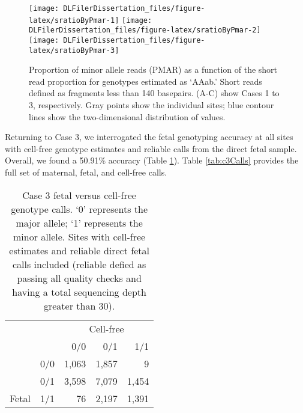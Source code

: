 \documentclass[11pt,letterpaper]{book}
\begin{document}
\begin{figure}

{\centering \texttt{[image: DLFilerDissertation\_files/figure-latex/sratioByPmar-1]} \texttt{[image: DLFilerDissertation\_files/figure-latex/sratioByPmar-2]} \texttt{[image: DLFilerDissertation\_files/figure-latex/sratioByPmar-3]} 

}

\caption[Relationship between PMAR and fraction of reads \textless140 basepairs.]{Proportion of minor allele reads (PMAR) as a function of the short read proportion for genotypes estimated as `AAab.' Short reads defined as fragments less than 140 basepairs. (A-C) show Cases 1 to 3, respectively. Gray points show the individual sites; blue contour lines show the two-dimensional distribution of values.}\label{fig:sratioByPmar}
\end{figure}

Returning to Case 3, we interrogated the fetal genotyping accuracy at all sites with cell-free genotype estimates and reliable calls from the direct fetal sample.
Overall, we found a 50.91\% accuracy (Table \ref{tab:c3FetByCf}).
Table \ref{tab:c3Calls} provides the full set of maternal, fetal, and cell-free calls.





\begin{table}

\caption[Case 3 fetal versus cell-free genotype calls.]{\label{tab:c3FetByCf}Case 3 fetal versus cell-free genotype calls. `0' represents the major allele; `1' represents the minor allele. Sites with cell-free estimates and reliable direct fetal calls included (reliable defied as passing all quality checks and having a total sequencing depth greater than 30).}
\centering
\begin{tabular}[t]{llrrr}
\toprule
\multicolumn{2}{c}{ } & \multicolumn{3}{c}{Cell-free} \\
\cmidrule(l{3pt}r{3pt}){3-5}
  &   & 0/0 & 0/1 & 1/1\\
\midrule
 & 0/0 & 1,063 & 1,857 & 9\\
\cmidrule{2-5}
 & 0/1 & 3,598 & 7,079 & 1,454\\
\cmidrule{2-5}
\multirow{-3}{*}{\raggedright\arraybackslash Fetal} & 1/1 & 76 & 2,197 & 1,391\\
\bottomrule
\end{tabular}
\end{table}
\end{document}
